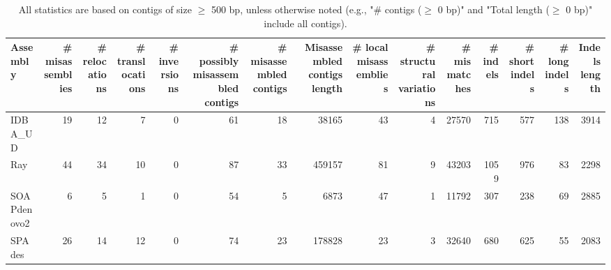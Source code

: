 \documentclass[12pt,a4paper]{article}
\begin{document}
\begin{table}[ht]
\begin{center}
\caption{All statistics are based on contigs of size $\geq$ 500 bp, unless otherwise noted (e.g., "\# contigs ($\geq$ 0 bp)" and "Total length ($\geq$ 0 bp)" include all contigs).}
\begin{tabular}{|l*{14}{|r}|}
\hline
Assembly & \# misassemblies &     \# relocations &     \# translocations &     \# inversions & \# possibly misassembled contigs & \# misassembled contigs & Misassembled contigs length & \# local misassemblies & \# structural variations & \# mismatches & \# indels &     \# short indels &     \# long indels & Indels length \\ \hline
IDBA\_UD & 19 & 12 & 7 & 0 & 61 & 18 & 38165 & 43 & 4 & 27570 & 715 & 577 & 138 & 3914 \\ \hline
Ray & 44 & 34 & 10 & 0 & 87 & 33 & 459157 & 81 & 9 & 43203 & 1059 & 976 & 83 & 2298 \\ \hline
SOAPdenovo2 & 6 & 5 & 1 & 0 & 54 & 5 & 6873 & 47 & 1 & 11792 & 307 & 238 & 69 & 2885 \\ \hline
SPAdes & 26 & 14 & 12 & 0 & 74 & 23 & 178828 & 23 & 3 & 32640 & 680 & 625 & 55 & 2083 \\ \hline
\end{tabular}
\end{center}
\end{table}
\end{document}

